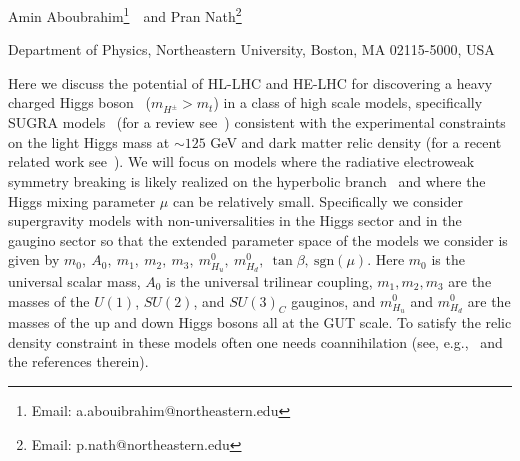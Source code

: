 \begin{center}
 {Amin Aboubrahim\footnote{Email: a.abouibrahim@northeastern.edu}~\ and 
Pran Nath\footnote{Email: p.nath@northeastern.edu}
}
\end{center}
\begin{center}
Department of Physics, Northeastern University, Boston, MA 02115-5000, USA
\end{center}



Here we discuss the potential of HL-LHC and HE-LHC for discovering a heavy charged Higgs boson~\cite{Aboubrahim:2018tpf} ($m_{H^{\pm}} > m_t$) in a class of high scale models, specifically SUGRA models~\cite{Chamseddine:1982jx,Nath:1983aw,Hall:1983iz} (for a review see~\cite{Nath:2016qzm}) consistent with the experimental constraints on the light Higgs mass at $\sim 125$ GeV and dark matter relic density (for a recent related work see~\cite{Aboubrahim:2018bil}).  We will focus on models where the
radiative  electroweak symmetry breaking is likely realized on the hyperbolic branch~\cite{Chan:1997bi}
and where the Higgs mixing parameter $\mu$ can be relatively small. Specifically we consider supergravity models with  non-universalities in  the Higgs sector and in the gaugino sector so that 
the extended parameter space of the models we consider is given by $m_0, ~A_0, ~m_1, ~m_2, ~m_3, ~m^0_{H_u}, ~m^0_{H_d}, ~\tan\beta, ~\text{sgn}(\mu)$.
Here $m_0$ is the universal scalar mass, $A_0$ is the universal trilinear coupling, 
$m_1,  m_2, m_3$ are the masses of the $U(1)$, $SU(2)$, and $SU(3)_C$ gauginos, and $m^0_{H_u}$ and $m^0_{H_d}$ are the 
masses of the up and down Higgs bosons all at the GUT scale. To satisfy the relic density constraint in these models often
one needs  coannihilation (see, e.g.,~\cite{Aboubrahim:2017aen,Aboubrahim:2017wjl} and the references therein).

